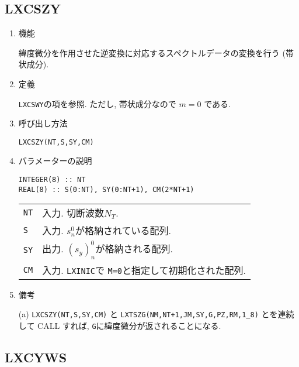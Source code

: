 \documentclass[a4j]{jarticle}
\begin{document}
\subsection{LXCSZY}

\begin{enumerate}

\item 機能

  緯度微分を作用させた逆変換に対応するスペクトルデータの変換を行う
  (帯状成分).
  
\item 定義

\texttt{LXCSWY}の項を参照. ただし, 帯状成分なので $m=0$ である.

\item 呼び出し方法 
    
\texttt{LXCSZY(NT,S,SY,CM)}
  
\item パラメーターの説明

\begin{verbatim}
INTEGER(8) :: NT
REAL(8) :: S(0:NT), SY(0:NT+1), CM(2*NT+1)
\end{verbatim}
      
\begin{tabular}{ll}
\texttt{NT} & 入力. 切断波数$N_T$.\\
\texttt{S} & 入力. $s^0_n$が格納されている配列.\\
\texttt{SY} & 出力. $(s_y)^0_n$が格納される配列.\\
\texttt{CM}  & 入力. \texttt{LXINIC}で \texttt{M=0}と指定して初期化された配列.\\
\end{tabular}

\item 備考

(a) \texttt{LXCSZY(NT,S,SY,CM)} と 
    \texttt{LXTSZG(NM,NT+1,JM,SY,G,PZ,RM,1\_8)}
    とを連続して CALL すれば, \texttt{G}に緯度微分が返されることになる.

\end{enumerate}

\subsection{LXCYWS}
\end{document}
